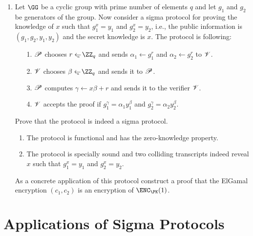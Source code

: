 \documentclass{article}
\begin{document}
\begin{enumerate}
\item Let $\GG$ be a cyclic group with prime number of elements $q$
  and let $g_1$ and $g_2$ be generators of the group. Now consider a
  sigma protocol for proving the knowledge of $x$ such that
  $g_1^x=y_1$ and $g_2^x=y_2$, i.e., the public information is
  $(g_1,g_2,y_1,y_2)$ and the secret knowledge is $x$. The protocol is
  following:
  \begin{enumerate}
  \item[1.] $\mathscr{P}$ chooses $r\getsu\ZZ_q$ and sends $\alpha_1\gets
    g_1^r$ and $\alpha_2\gets g_2^r$ to $\mathscr{V}$.
  \item[2.] $\mathscr{V}$ chooses $\beta\getsu\ZZ_q$ and sends it to $\mathscr{P}$.
  \item[3.] $\mathscr{P}$ computes $\gamma\gets x\beta+r$ and sends it to
    the verifier $\mathscr{V}$.
  \item[4.] $\mathscr{V}$ accepts the proof if $g_1^{\gamma}=\alpha_1
    y_1^\beta$ and $g_2^{\gamma}=\alpha_2 y_2^\beta$.
  \end{enumerate}
  Prove that the protocol is indeed a sigma protocol.
  \begin{enumerate}
  \item The protocol is functional and has the zero-knowledge
    property.
  \item The protocol is specially sound and two colliding transcripts
    indeed reveal $x$ such that $g_1^x=y_1$ and $g_2^x=y_2$.
  \end{enumerate}
  As a concrete application of this protocol construct a proof that
  the ElGamal encryption $(c_1,c_2)$ is an encryption of $\ENC_\PK(1)$.
\end{enumerate}


\section*{Applications of Sigma Protocols}
\end{document}
